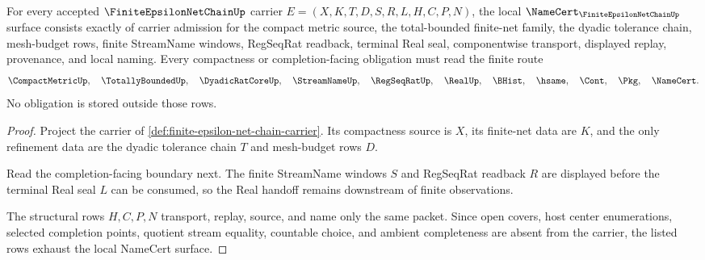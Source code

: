 \begin{theorem}
\label{thm:finite-epsilon-net-chain-namecert-obligations}
For every accepted $\FiniteEpsilonNetChainUp$ carrier $E=(X,K,T,D,S,R,L,H,C,P,N)$, the local $\NameCert_{\FiniteEpsilonNetChainUp}$ surface consists exactly of carrier admission for the compact metric source, the total-bounded finite-net family, the dyadic tolerance chain, mesh-budget rows, finite StreamName windows, RegSeqRat readback, terminal Real seal, componentwise transport, displayed replay, provenance, and local naming. Every compactness or completion-facing obligation must read the finite route
$$
\CompactMetricUp,\quad
\TotallyBoundedUp,\quad
\DyadicRatCoreUp,\quad
\StreamNameUp,\quad
\RegSeqRatUp,\quad
\RealUp,\quad
\BHist,\quad
\hsame,\quad
\Cont,\quad
\Pkg,\quad
\NameCert .
$$
No obligation is stored outside those rows.
\end{theorem}
\begin{proof}
Project the carrier of \autoref{def:finite-epsilon-net-chain-carrier}. Its compactness source is $X$, its finite-net data are $K$, and the only refinement data are the dyadic tolerance chain $T$ and mesh-budget rows $D$.

Read the completion-facing boundary next. The finite StreamName windows $S$ and RegSeqRat readback $R$ are displayed before the terminal Real seal $L$ can be consumed, so the Real handoff remains downstream of finite observations.

The structural rows $H,C,P,N$ transport, replay, source, and name only the same packet. Since open covers, host center enumerations, selected completion points, quotient stream equality, countable choice, and ambient completeness are absent from the carrier, the listed rows exhaust the local NameCert surface.
\end{proof}

